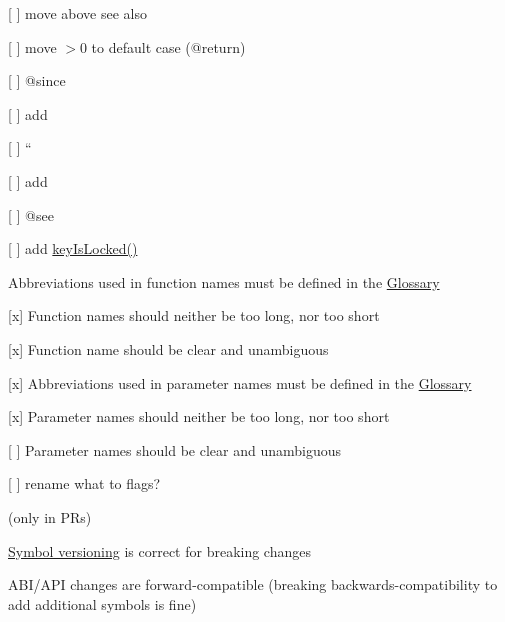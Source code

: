 \begin{DoxyItemize}
\begin{DoxyItemize}
\item \mbox{[} \mbox{]} move above see also
\item \mbox{[} \mbox{]} move {\ttfamily $>$0} to default case ({\ttfamily @return})
\end{DoxyItemize}
\item \mbox{[} \mbox{]} {\ttfamily @since}
\begin{DoxyItemize}
\item \mbox{[} \mbox{]} add
\end{DoxyItemize}
\item \mbox{[} \mbox{]} ``
\begin{DoxyItemize}
\item \mbox{[} \mbox{]} add
\end{DoxyItemize}
\item \mbox{[} \mbox{]} {\ttfamily @see}
\begin{DoxyItemize}
\item \mbox{[} \mbox{]} add {\ttfamily \hyperlink{group__key_ga769882e86e34a95cefcf8f260ef97e06}{key\+Is\+Locked()}}
\end{DoxyItemize}
\end{DoxyItemize}


\begin{DoxyItemize}
\item Abbreviations used in function names must be defined in the \hyperlink{doc_help_elektra-glossary_md}{Glossary}
\item \mbox{[}x\mbox{]} Function names should neither be too long, nor too short
\item \mbox{[}x\mbox{]} Function name should be clear and unambiguous
\item \mbox{[}x\mbox{]} Abbreviations used in parameter names must be defined in the \hyperlink{doc_help_elektra-glossary_md}{Glossary}
\item \mbox{[}x\mbox{]} Parameter names should neither be too long, nor too short
\item \mbox{[} \mbox{]} Parameter names should be clear and unambiguous
\begin{DoxyItemize}
\item \mbox{[} \mbox{]} rename what to flags?
\end{DoxyItemize}
\end{DoxyItemize}

(only in P\+Rs)


\begin{DoxyItemize}
\item \hyperlink{doc_dev_symbol-versioning_md}{Symbol versioning} is correct for breaking changes
\item A\+B\+I/\+A\+PI changes are forward-\/compatible (breaking backwards-\/compatibility to add additional symbols is fine)
\end{DoxyItemize}


